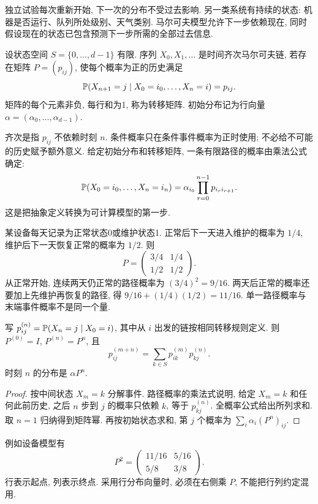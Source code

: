 
独立试验每次重新开始, 下一次的分布不受过去影响. 另一类系统有持续的状态: 机器是否运行、队列所处级别、天气类别. 马尔可夫模型允许下一步依赖现在, 同时假设现在的状态已包含预测下一步所需的全部过去信息.
\begin{definition}
设状态空间 $S=\{0,\ldots,d-1\}$ 有限. 序列 $X_0,X_1,\ldots$ 是时间齐次马尔可夫链, 若存在矩阵 $P=(p_{ij})$, 使每个概率为正的历史满足
\[\mathbb P(X_{n+1}=j\mid X_0=i_0,\ldots,X_n=i)=p_{ij}.\]
矩阵的每个元素非负, 每行和为1, 称为转移矩阵. 初始分布记为行向量 $\alpha=(\alpha_0,\ldots,\alpha_{d-1})$.
\end{definition}
齐次是指 $p_{ij}$ 不依赖时刻 $n$. 条件概率只在条件事件概率为正时使用; 不必给不可能的历史赋予额外意义. 给定初始分布和转移矩阵, 一条有限路径的概率由乘法公式确定:
\[\mathbb P(X_0=i_0,\ldots,X_n=i_n)=\alpha_{i_0}\prod_{r=0}^{n-1}p_{i_ri_{r+1}}.\]
这是把抽象定义转换为可计算模型的第一步.

\begin{example}
某设备每天记录为正常状态0或维护状态1. 正常后下一天进入维护的概率为 $1/4$, 维护后下一天恢复正常的概率为 $1/2$. 则
\[P=\begin{pmatrix}3/4&1/4\\1/2&1/2\end{pmatrix}.\]
从正常开始, 连续两天仍正常的路径概率为 $(3/4)^2=9/16$. 两天后正常的概率还要加上先维护再恢复的路径, 得 $9/16+(1/4)(1/2)=11/16$. 单一路径概率与末端事件概率不是同一个量.
\end{example}
\begin{center}
\end{center}

\begin{proposition}
写 $p_{ij}^{(n)}=\mathbb P(X_n=j\mid X_0=i)$, 其中从 $i$ 出发的链按相同转移规则定义. 则 $P^{(0)}=I$, $P^{(n)}=P^n$, 且
\[p_{ij}^{(m+n)}=\sum_{k\in S}p_{ik}^{(m)}p_{kj}^{(n)}.\]
时刻 $n$ 的分布是 $\alpha P^n$.
\end{proposition}
\begin{proof}
按中间状态 $X_m=k$ 分解事件. 路径概率的乘法式说明, 给定 $X_m=k$ 和任何此前历史, 之后 $n$ 步到 $j$ 的概率只依赖 $k$, 等于 $p_{kj}^{(n)}$. 全概率公式给出所列求和. 取 $n=1$ 归纳得到矩阵幂. 再按初始状态求和, 第 $j$ 个概率为 $\sum_i\alpha_i(P^n)_{ij}$.
\end{proof}
例如设备模型有
\[P^2=\begin{pmatrix}11/16&5/16\\5/8&3/8\end{pmatrix}.\]
行表示起点, 列表示终点. 采用行分布向量时, 必须在右侧乘 $P$, 不能把行列约定混用.

